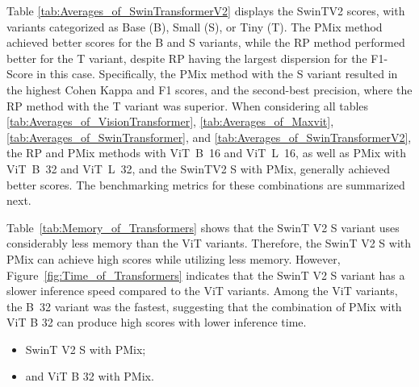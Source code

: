 Table \ref{tab:Averages_of_SwinTransformerV2} displays the \gls{SwinTV2} scores, with variants categorized as Base (B), Small (S), or Tiny (T). The \gls{PMix} method achieved better scores for the B and S variants, while the \gls{RP} method performed better for the T variant, despite \gls{RP} having the largest dispersion for the F1-Score in this case. Specifically, the \gls{PMix} method with the S variant resulted in the highest Cohen Kappa and F1 scores, and the second-best precision, where the \gls{RP} method with the T variant was superior.
When considering all tables \ref{tab:Averages_of_VisionTransformer}, \ref{tab:Averages_of_Maxvit}, \ref{tab:Averages_of_SwinTransformer}, and \ref{tab:Averages_of_SwinTransformerV2}, the \gls{RP} and \gls{PMix} methods with \mbox{\gls{ViT} B 16} and \mbox{\gls{ViT} L 16}, as well as \gls{PMix} with \mbox{\gls{ViT} B 32} and \mbox{\gls{ViT} L 32}, and the \gls{SwinTV2} S with \gls{PMix}, generally achieved better scores. The benchmarking metrics for these combinations are summarized next.

Table~\ref{tab:Memory_of_Transformers} shows that the \gls{SwinT} V2 S variant uses considerably less memory than the \gls{ViT} variants. Therefore, the \gls{SwinT} V2 S with \gls{PMix} can achieve high scores while utilizing less memory. However, Figure~\ref{fig:Time_of_Transformers} indicates that the \gls{SwinT} V2 S variant has a slower inference speed compared to the \gls{ViT} variants. Among the \gls{ViT} variants, the \mbox{B 32} variant was the fastest, suggesting that the combination of \gls{PMix} with \gls{ViT} B 32 can produce high scores with lower inference time.  
\begin{itemize}
	\item \gls{SwinT} V2 S with \gls{PMix};
	\item and \gls{ViT} B 32 with \gls{PMix}. 
\end{itemize}

